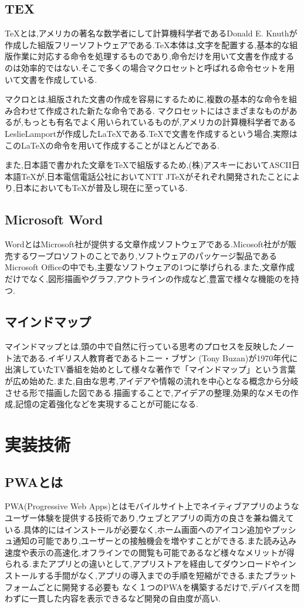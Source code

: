 \documentclass[a4j,12pt]{jarticle}
\begin{document}
\subsection{TEX}
TeXとは,アメリカの著名な数学者にして計算機科学者であるDonald E. Knuthが作成した組版フリーソフトウェアである.TeX本体は,文字を配置する,基本的な組版作業に対応する命令を処理するものであり,命令だけを用いて文書を作成するのは効率的ではない.そこで多くの場合マクロセットと呼ばれる命令セットを用いて文書を作成している.

マクロとは,組版された文書の作成を容易にするために,複数の基本的な命令を組み合わせて作成された新たな命令である.
マクロセットにはさまざまなものがあるが,もっとも有名でよく用いられているものが,アメリカの計算機科学者であるLeslieLamportが作成したLaTeXである.TeXで文書を作成するという場合,実際はこのLaTeXの命令を用いて作成することがほとんどである.

また,日本語で書かれた文章をTeXで組版するため,(株)アスキーにおいてASCII日本語TeXが,日本電信電話公社においてNTT JTeXがそれぞれ開発されたことにより,日本においてもTeXが普及し現在に至っている\cite{ren3}.

\subsection{Microsoft Word}
WordとはMicrosoft社が提供する文章作成ソフトウェアである.Micosoft社がが販売するワープロソフトのことであり,ソフトウェアのパッケージ製品であるMicrosoft Officeの中でも,主要なソフトウェアの1つに挙げられる.また,文章作成だけでなく,図形描画やグラフ,アウトラインの作成など,豊富で様々な機能のを持つ.
\newpage
\subsection{マインドマップ}
マインドマップとは,頭の中で自然に行っている思考のプロセスを反映したノート法である.イギリス人教育者であるトニー・ブザン (Tony Buzan)が1970年代に出演していたTV番組を始めとして様々な著作で「マインドマップ」という言葉が広め始めた\cite{ren4}.また,自由な思考,アイデアや情報の流れを中心となる概念から分岐させる形で描画した図である.描画することで,アイデアの整理,効果的なメモの作成,記憶の定着強化などを実現することが可能になる.%

\newpage
\section{実装技術}
\subsection{PWAとは}
PWA(Progressive Web Apps)とはモバイルサイト上でネイティブアプリのようなユーザー体験を提供する技術であり,ウェブとアプリの両方の良さを兼ね備えている.具体的にはインストールが必要なく,ホーム画面へのアイコン追加やプッシュ通知の可能であり,ユーザーとの接触機会を増やすことができる.また読み込み速度や表示の高速化,オフラインでの閲覧も可能であるなど様々なメリットが得られる.またアプリとの違いとして,アプリストアを経由してダウンロードやインストールする手間がなく,アプリの導入までの手順を短縮ができる.またプラットフォームごとに開発する必要も
なく１つのPWAを構築するだけで,デバイスを問わずに一貫した内容を表示できるなど開発の自由度が高い\cite{ren6}.
\newpage
\end{document}
